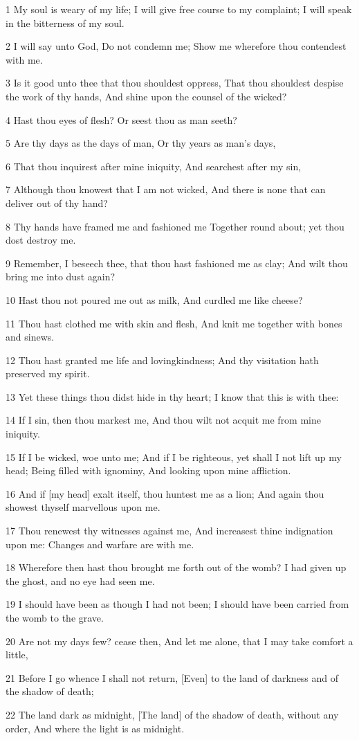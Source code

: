 \par 1 My soul is weary of my life; I will give free course to my complaint; I will speak in the bitterness of my soul.
\par 2 I will say unto God, Do not condemn me; Show me wherefore thou contendest with me.
\par 3 Is it good unto thee that thou shouldest oppress, That thou shouldest despise the work of thy hands, And shine upon the counsel of the wicked?
\par 4 Hast thou eyes of flesh? Or seest thou as man seeth?
\par 5 Are thy days as the days of man, Or thy years as man's days,
\par 6 That thou inquirest after mine iniquity, And searchest after my sin,
\par 7 Although thou knowest that I am not wicked, And there is none that can deliver out of thy hand?
\par 8 Thy hands have framed me and fashioned me Together round about; yet thou dost destroy me.
\par 9 Remember, I beseech thee, that thou hast fashioned me as clay; And wilt thou bring me into dust again?
\par 10 Hast thou not poured me out as milk, And curdled me like cheese?
\par 11 Thou hast clothed me with skin and flesh, And knit me together with bones and sinews.
\par 12 Thou hast granted me life and lovingkindness; And thy visitation hath preserved my spirit.
\par 13 Yet these things thou didst hide in thy heart; I know that this is with thee:
\par 14 If I sin, then thou markest me, And thou wilt not acquit me from mine iniquity.
\par 15 If I be wicked, woe unto me; And if I be righteous, yet shall I not lift up my head; Being filled with ignominy, And looking upon mine affliction.
\par 16 And if [my head] exalt itself, thou huntest me as a lion; And again thou showest thyself marvellous upon me.
\par 17 Thou renewest thy witnesses against me, And increasest thine indignation upon me: Changes and warfare are with me.
\par 18 Wherefore then hast thou brought me forth out of the womb? I had given up the ghost, and no eye had seen me.
\par 19 I should have been as though I had not been; I should have been carried from the womb to the grave.
\par 20 Are not my days few? cease then, And let me alone, that I may take comfort a little,
\par 21 Before I go whence I shall not return, [Even] to the land of darkness and of the shadow of death;
\par 22 The land dark as midnight, [The land] of the shadow of death, without any order, And where the light is as midnight.

